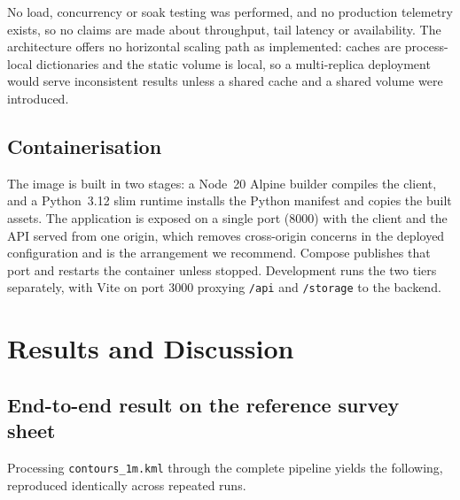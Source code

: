 \documentclass[sigconf,review,10pt]{acmart}
\begin{document}
No load, concurrency or soak testing was performed, and no production
telemetry exists, so no claims are made about throughput, tail latency or
availability. The architecture offers no horizontal scaling path as
implemented: caches are process-local dictionaries and the static volume is
local, so a multi-replica deployment would serve inconsistent results
unless a shared cache and a shared volume were introduced.

\subsection{Containerisation}

The image is built in two stages: a Node~20 Alpine builder compiles the
client, and a Python~3.12 slim runtime installs the Python manifest and
copies the built assets. The application is exposed on a single port
(8000) with the client and the API served from one origin, which removes
cross-origin concerns in the deployed configuration and is the arrangement
we recommend. Compose publishes that port and restarts the container
unless stopped. Development runs the two tiers separately, with Vite on
port 3000 proxying \texttt{/api} and \texttt{/storage} to the backend.

\section{Results and Discussion}
\label{sec:discussion}

\subsection{End-to-end result on the reference survey sheet}

Processing \texttt{contours\_1m.kml} through the complete pipeline yields
the following, reproduced identically across repeated runs.
\end{document}
